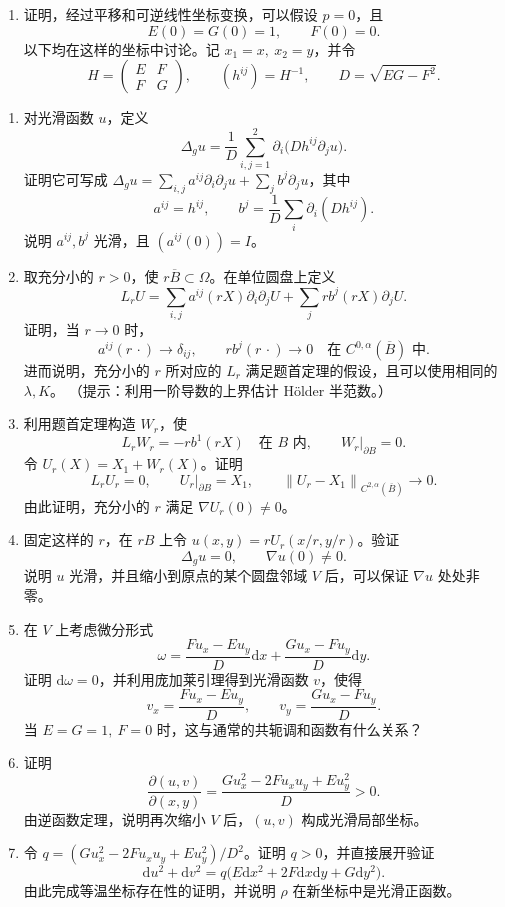 \documentclass[UTF8,a4paper,10pt,fontset=fandol]{ctexart}
\newcommand{\dd}{\mathrm d}
\newcommand{\norm}[1]{\left\lVert#1\right\rVert}
\newcommand{\pa}{\partial}
\begin{document}
\begin{enumerate}
\item 证明，经过平移和可逆线性坐标变换，可以假设 $p=0$，且
\[
E(0)=G(0)=1,\qquad F(0)=0.
\]
以下均在这样的坐标中讨论。记 $x_1=x,\ x_2=y$，并令
\[
H=\begin{pmatrix}E&F\\F&G\end{pmatrix},\qquad
(h^{ij})=H^{-1},\qquad D=\sqrt{EG-F^2}.
\]
\end{enumerate}
\newpage
\begin{enumerate}[resume]
\item 对光滑函数 $u$，定义
\[
\Delta_g u=\frac1D\sum_{i,j=1}^2\pa_i\bigl(Dh^{ij}\pa_j u\bigr).
\]
证明它可写成 $\Delta_g u=\sum_{i,j}a^{ij}\pa_i\pa_j u+\sum_j b^j\pa_j u$，其中
\[
a^{ij}=h^{ij},\qquad b^j=\frac1D\sum_i\pa_i(Dh^{ij}).
\]
说明 $a^{ij},b^j$ 光滑，且 $(a^{ij}(0))=I$。

\item 取充分小的 $r>0$，使 $r\overline B\subset\Omega$。在单位圆盘上定义
\[
L_rU=\sum_{i,j}a^{ij}(rX)\pa_i\pa_jU
+\sum_j r b^j(rX)\pa_jU.
\]
证明，当 $r\to0$ 时，
\[
a^{ij}(r\,\cdot)\longrightarrow\delta_{ij},\qquad
r b^j(r\,\cdot)\longrightarrow0
\quad\text{在 }C^{0,\alpha}(\overline B)\text{ 中}.
\]
进而说明，充分小的 $r$ 所对应的 $L_r$ 满足题首定理的假设，且可以使用相同的 $\lambda,K$。
（提示：利用一阶导数的上界估计 Hölder 半范数。）

\item 利用题首定理构造 $W_r$，使
\[
L_rW_r=-r b^1(rX)\quad\text{在 }B\text{ 内},\qquad
W_r|_{\pa B}=0.
\]
令 $U_r(X)=X_1+W_r(X)$。证明
\[
L_rU_r=0,\qquad U_r|_{\pa B}=X_1,\qquad
\norm{U_r-X_1}_{C^{2,\alpha}(\overline B)}\longrightarrow0.
\]
由此证明，充分小的 $r$ 满足 $\nabla U_r(0)\ne0$。

\item 固定这样的 $r$，在 $rB$ 上令 $u(x,y)=rU_r(x/r,y/r)$。验证
\[
\Delta_g u=0,\qquad \nabla u(0)\ne0.
\]
说明 $u$ 光滑，并且缩小到原点的某个圆盘邻域 $V$ 后，可以保证 $\nabla u$ 处处非零。

\item 在 $V$ 上考虑微分形式
\[
\omega=\frac{Fu_x-Eu_y}{D}\dd x+\frac{Gu_x-Fu_y}{D}\dd y.
\]
证明 $\dd\omega=0$，并利用庞加莱引理得到光滑函数 $v$，使得
\[
v_x=\frac{Fu_x-Eu_y}{D},\qquad v_y=\frac{Gu_x-Fu_y}{D}.
\]
当 $E=G=1,\ F=0$ 时，这与通常的共轭调和函数有什么关系？

\item 证明
\[
\frac{\pa(u,v)}{\pa(x,y)}=
\frac{Gu_x^2-2Fu_xu_y+Eu_y^2}{D}>0.
\]
由逆函数定理，说明再次缩小 $V$ 后，$(u,v)$ 构成光滑局部坐标。

\item 令 $q=(Gu_x^2-2Fu_xu_y+Eu_y^2)/D^2$。证明 $q>0$，并直接展开验证
\[
\dd u^2+\dd v^2=q\bigl(E\dd x^2+2F\dd x\dd y+G\dd y^2\bigr).
\]
由此完成等温坐标存在性的证明，并说明 $\rho$ 在新坐标中是光滑正函数。
\end{enumerate}
\end{document}
